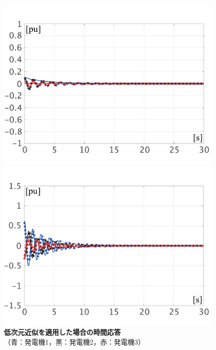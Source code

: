 \documentclass[tombow,dvipdfmx]{corona-a5-1.1}
\begin{document}
\begin{figure}[t]
{\begin{minipage}{0.49\linewidth}
    \centering
    \includegraphics[width = 1.0\linewidth]{figs/Espa}
    \medskip
  \end{minipage}
  \begin{minipage}{0.49\linewidth}
    \centering
    \includegraphics[width = 1.0\linewidth]{figs/Pspa}
    \medskip
  \end{minipage}
  }
  \medskip
  \caption{\textbf{低次元近似を適用した場合の時間応答}
  \\  \centering（青：発電機1，黒：発電機2，赤：発電機3）}
  \label{fig:timeexsp}
\medskip
\end{figure}
\end{document}
